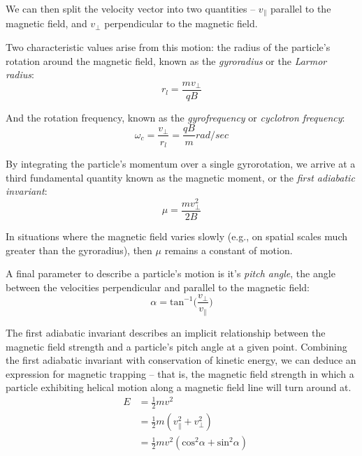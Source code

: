 We can then split the velocity vector into two quantities -- $v_\parallel$ parallel to the magnetic field, and $v_\perp$ perpendicular to the magnetic field.

Two characteristic values arise from this motion: the radius of the particle's rotation around the magnetic field, known as the \emph{gyroradius} or the \emph{Larmor radius}:
\begin{equation}
r_l = \frac{m v_\perp}{qB}
\end{equation}

And the rotation frequency, known as the \emph{gyrofrequency} or \emph{cyclotron frequency}:
\begin{equation}
\omega_c = \frac{v_\perp}{r_l} = \frac{q B}{m} \unit{rad/sec}
\end{equation}

By integrating the particle's momentum over a single gyrorotation, we arrive at a third fundamental quantity known as the magnetic moment, or the \emph{first adiabatic invariant}:
\begin{equation}
\mu = \frac{m v_\perp^2}{2B}
\label{eqn:first_adiabatic_invariant}
\end{equation}

In situations where the magnetic field varies slowly (e.g., on spatial scales much greater than the gyroradius), then $\mu$ remains a constant of motion.

A final parameter to describe a particle's motion is it's \emph{pitch angle}, the angle between the velocities perpendicular and parallel to the magnetic field:
\begin{equation}
\alpha = \mathrm{tan}^{-1}\bigg(\frac{v_\perp}{v_\parallel}\bigg)
\end{equation}

The first adiabatic invariant describes an implicit relationship between the magnetic field strength and a particle's pitch angle at a given point. 
Combining the first adiabatic invariant with conservation of kinetic energy, we can deduce an expression for magnetic trapping -- that is, the magnetic field strength in which a particle exhibiting helical motion along a magnetic field line will turn around at. 
\begin{eqnarray}
& E &= \frac{1}{2}mv^2 \\
& &= \frac{1}{2}m(v_\parallel^2 + v_\perp^2) \\
 & &= \frac{1}{2}mv^2(\mathrm{cos}^2\alpha + \mathrm{sin}^2\alpha)
\end{eqnarray}

